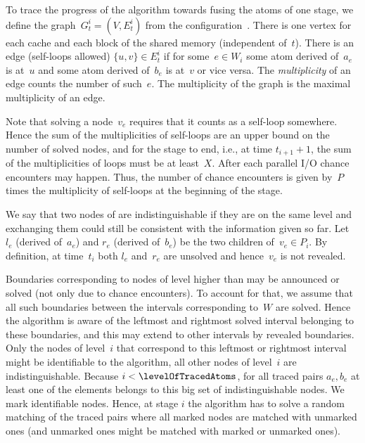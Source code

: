 \documentclass[envcountsame]{llncs}
\begin{document}
To trace the progress of the algorithm towards fusing the atoms of one stage, we define the graph~$G_t^i=(V,E_t^i)$ from the configuration~.
There is one vertex for each cache and each block of the shared memory (independent of~$t$).
There is an edge (self-loops allowed) $\{u,v\} \in E_t^i$ if for some~$e\in W_i$ some atom derived of~$a_e$ is at~$u$ and some atom derived of~$b_e$ is at~$v$ or vice versa.
The \emph{multiplicity} of an edge counts the number of such~$e$.
The multiplicity of the graph is the maximal multiplicity of an edge.

Note that solving a node~$v_e$ requires that it counts as a self-loop somewhere.
Hence the sum of the multiplicities of self-loops are an upper bound on the number of solved nodes, and for the stage to end, i.e., at time $t_{i+1}+1$, the sum of the multiplicities of loops must be at least~$X$.
After each parallel I/O chance encounters may happen.
Thus, the number of chance encounters is given by~$P$ times the  multiplicity of self-loops at the beginning of the stage.



We say that two nodes of \binaryTreeOf{\gifInstance} are indistinguishable if they are on the same level and exchanging them could still be consistent with the information given so far.
Let~$l_e$ (derived of~$a_e$) and $r_e$ (derived of~$b_e$) be the two children of~$v_e \in P_i$.
By definition, at time~$t_i$ both $l_e$ and~$r_e$ are unsolved and hence~$v_e$ is not revealed. 

Boundaries corresponding to nodes of level higher than \levelOfTracedAtoms may be announced or solved (not only due to chance encounters). 
To account for that, we assume that all such boundaries between the intervals corresponding to~$W$ are solved.
Hence the algorithm is aware of the leftmost and rightmost solved interval belonging to these boundaries, and this may extend to other intervals by revealed boundaries.
Only the nodes of level~$i$ that correspond to this leftmost or rightmost interval might be identifiable to the algorithm, all other nodes of level~$i$ are indistinguishable. 
Because $i<\levelOfTracedAtoms$, for all traced pairs $a_e,b_e$ at least one of the elements belongs to this big set of indistinguishable nodes.
We mark identifiable nodes. Hence, at stage $i$ the algorithm has to solve a random matching of the traced pairs where all marked nodes are matched with unmarked ones (and unmarked ones might be matched with marked or unmarked ones). 
\end{document}
